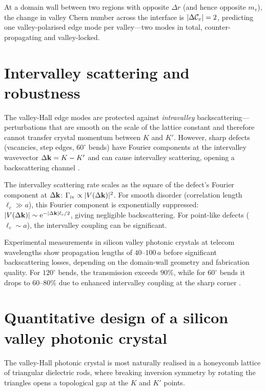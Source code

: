 At a domain wall between two regions with opposite $\Delta r$ (and
hence opposite $m_v$), the change in valley Chern number across the
interface is $|\Delta\mathcal{C}_v|=2$, predicting one valley-polarised
edge mode per valley---two modes in total, counter-propagating and
valley-locked.

\section{Intervalley scattering and robustness}
\label{sec:ch12-intervalley-scattering}

The valley-Hall edge modes are protected against
\emph{intravalley} backscattering---perturbations that are smooth on
the scale of the lattice constant and therefore cannot transfer
crystal momentum between $K$ and $K'$.  However, sharp defects
(vacancies, step edges, $60^\circ$ bends) have Fourier components at
the intervalley wavevector $\Delta\mathbf{k}=K-K'$ and can cause
intervalley scattering, opening a backscattering channel
\cite{tang2022vector}.

The intervalley scattering rate scales as the square of the defect's
Fourier component at $\Delta\mathbf{k}$:
$\Gamma_{\mathrm{iv}}\propto|V(\Delta\mathbf{k})|^2$.
For smooth disorder (correlation length $\ell_c\gg a$), this Fourier
component is exponentially suppressed:
$|V(\Delta\mathbf{k})|\sim\mathrm{e}^{-|\Delta\mathbf{k}|\ell_c/2}$, giving negligible
backscattering.  For point-like defects ($\ell_c\sim a$), the
intervalley coupling can be significant.

Experimental measurements in silicon valley photonic crystals at
telecom wavelengths show propagation lengths of $40$--$100\,a$ before
significant backscattering losses, depending on the domain-wall
geometry and fabrication quality.  For $120^\circ$ bends, the
transmission exceeds $90\%$, while for $60^\circ$ bends it drops
to $60$--$80\%$ due to enhanced intervalley coupling at the sharp
corner \cite{wu2017direct,noh2018observation,price2022roadmap}.

\section{Quantitative design of a silicon valley photonic crystal}
\label{sec:ch12-silicon-design}

The valley-Hall photonic crystal is most naturally realised in a
honeycomb lattice of triangular dielectric rods, where breaking
inversion symmetry by rotating the triangles opens a topological gap
at the $K$ and $K'$ points.


